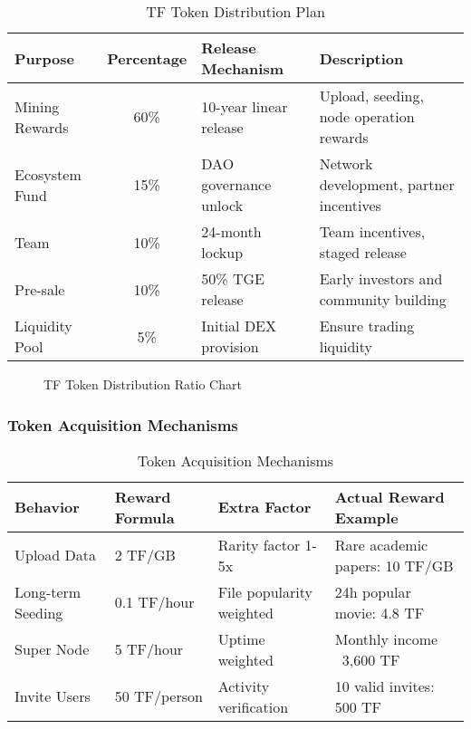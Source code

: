 \documentclass[12pt,a4paper]{article}
\begin{document}
\begin{table}[htbp]
\centering
\begin{tabular}{|l|c|l|l|}
\hline
\textbf{Purpose} & \textbf{Percentage} & \textbf{Release Mechanism} & \textbf{Description} \\
\hline
Mining Rewards & 60\% & 10-year linear release & Upload, seeding, node operation rewards \\
\hline
Ecosystem Fund & 15\% & DAO governance unlock & Network development, partner incentives \\
\hline
Team & 10\% & 24-month lockup & Team incentives, staged release \\
\hline
Pre-sale & 10\% & 50\% TGE release & Early investors and community building \\
\hline
Liquidity Pool & 5\% & Initial DEX provision & Ensure trading liquidity \\
\hline
\end{tabular}
\caption{TF Token Distribution Plan}
\end{table}

\begin{figure}[htbp]
\centering
{}
\caption{TF Token Distribution Ratio Chart}
\end{figure}

\subsubsection{Token Acquisition Mechanisms}

\begin{table}[htbp]
\centering
\begin{tabular}{|l|l|l|l|}
\hline
\textbf{Behavior} & \textbf{Reward Formula} & \textbf{Extra Factor} & \textbf{Actual Reward Example} \\
\hline
Upload Data & 2 TF/GB & Rarity factor 1-5x & Rare academic papers: 10 TF/GB \\
\hline
Long-term Seeding & 0.1 TF/hour & File popularity weighted & 24h popular movie: 4.8 TF \\
\hline
Super Node & 5 TF/hour & Uptime weighted & Monthly income ~3,600 TF \\
\hline
Invite Users & 50 TF/person & Activity verification & 10 valid invites: 500 TF \\
\hline
\end{tabular}
\caption{Token Acquisition Mechanisms}
\end{table}
\end{document}
